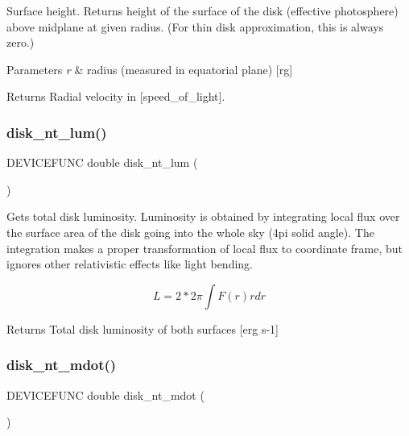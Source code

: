 Surface height. Returns height of the surface of the disk (effective photosphere) above midplane at given radius. (For thin disk approximation, this is always zero.)


\begin{DoxyParams}{Parameters}
{\em r} & radius (measured in equatorial plane) \mbox{[}rg\mbox{]}\\
\hline
\end{DoxyParams}
\begin{DoxyReturn}{Returns}
Radial velocity in \mbox{[}speed\+\_\+of\+\_\+light\mbox{]}. 
\end{DoxyReturn}
\mbox{\label{sim5disk-nt_8c_a9f4d9802a8c4133589b71066d45086de}} 
\subsubsection{\texorpdfstring{disk\+\_\+nt\+\_\+lum()}{disk\_nt\_lum()}}
{\footnotesize\ttfamily D\+E\+V\+I\+C\+E\+F\+U\+NC double disk\+\_\+nt\+\_\+lum (\begin{DoxyParamCaption}{ }\end{DoxyParamCaption})}

Gets total disk luminosity. Luminosity is obtained by integrating local flux over the surface area of the disk going into the whole sky (4pi solid angle). The integration makes a proper transformation of local flux to coordinate frame, but ignores other relativistic effects like light bending.

\[L = 2 * 2\pi \int F(r) r dr\]

\begin{DoxyReturn}{Returns}
Total disk luminosity of both surfaces \mbox{[}erg s-\/1\mbox{]} 
\end{DoxyReturn}
\mbox{\label{sim5disk-nt_8c_a5886e0305745277c267ce2c160973d0b}} 
\subsubsection{\texorpdfstring{disk\+\_\+nt\+\_\+mdot()}{disk\_nt\_mdot()}}
{\footnotesize\ttfamily D\+E\+V\+I\+C\+E\+F\+U\+NC double disk\+\_\+nt\+\_\+mdot (\begin{DoxyParamCaption}{ }\end{DoxyParamCaption})}

